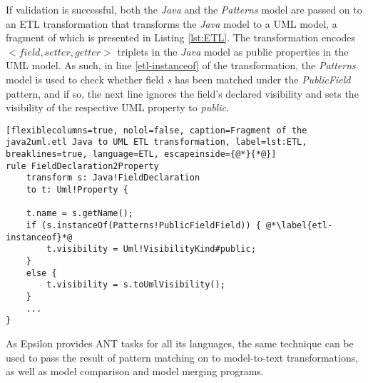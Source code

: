 If validation is successful, both the \emph{Java} and the \emph{Patterns} model are passed on to an ETL transformation that transforms the \emph{Java} model to a UML model, a fragment of which is presented in Listing \ref{lst:ETL}. The transformation encodes $<field, setter, getter>$ triplets in the \emph{Java} model as public properties in the UML model. As such, in line \ref{etl-instanceof} of the transformation, the \emph{Patterns} model is used to check whether field \emph{s} has been matched under the \emph{PublicField} pattern, and if so, the next line ignores the field's declared visibility and sets the visibility of the respective UML property to \emph{public}.

\begin{lstlisting}[flexiblecolumns=true, nolol=false, caption=Fragment of the java2uml.etl Java to UML ETL transformation, label=lst:ETL, breaklines=true, language=ETL, escapeinside={@*}{*@}]
rule FieldDeclaration2Property
	transform s: Java!FieldDeclaration
	to t: Uml!Property {
	
	t.name = s.getName();
	if (s.instanceOf(Patterns!PublicFieldField)) { @*\label{etl-instanceof}*@
		t.visibility = Uml!VisibilityKind#public;
	}
	else {
		t.visibility = s.toUmlVisibility();
	}
	...
}
\end{lstlisting}

As Epsilon provides ANT tasks for all its languages, the same technique can be used to pass the result of pattern matching on to model-to-text transformations, as well as model comparison and model merging programs.
